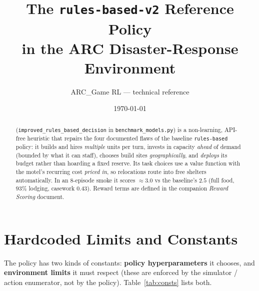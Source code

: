 \documentclass[11pt]{article}
\title{\textbf{The \texttt{rules-based-v2} Reference Policy\\ in the ARC Disaster-Response Environment}}
\author{ARC\_Game RL --- technical reference}
\date{\today}
\newcommand{\py}[1]{{\color{pyorange}\texttt{\small #1}}}
\begin{document}
\maketitle

\begin{abstract}
\noindent \py{rules-based-v2} (\py{improved\_rules\_based\_decision} in \py{benchmark\_models.py})
is a non-learning, API-free heuristic that repairs the four documented flaws of the baseline
\py{rules-based} policy: it builds and hires \emph{multiple} units per turn, invests in capacity
\emph{ahead} of demand (bounded by what it can staff), chooses build sites \emph{geographically},
and \emph{deploys} its budget rather than hoarding a fixed reserve. Its task choices use a value
function with the motel's recurring cost \emph{priced in}, so relocations route into free shelters
automatically. In an 8-episode smoke it scores $\approx 3.0$ vs the baseline's $2.5$ (full food,
$93\%$ lodging, casework $0.43$). Reward terms are defined in the companion \emph{Reward Scoring}
document.
\end{abstract}

\tableofcontents
\vspace{1em}

\section{Hardcoded Limits and Constants}

The policy has two kinds of constants: \textbf{policy hyperparameters} it chooses, and
\textbf{environment limits} it must respect (these are enforced by the simulator / action
enumerator, not by the policy). Table~\ref{tab:consts} lists both.
\end{document}

